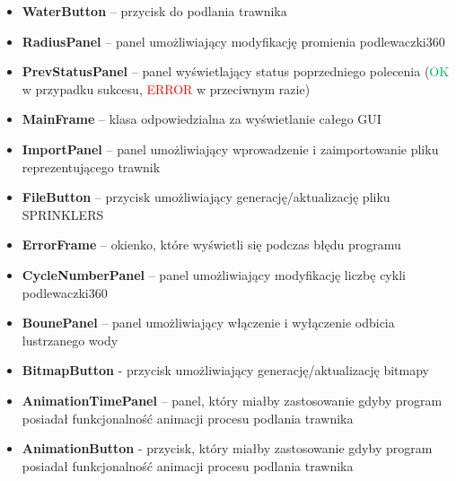 \documentclass[12pt]{article}
\renewcommand{\_}{\kern-1.5pt\textunderscore\kern-1.5pt}
\begin{document}
\begin{enumerate}
\begin{itemize}
	\item \textbf{WaterButton} – przycisk do podlania trawnika\par

	\item \textbf{RadiusPanel} – panel umożliwiający modyfikację promienia podlewaczki360\par

	\item \textbf{PrevStatusPanel} – panel wyświetlający status poprzedniego polecenia (\textcolor[HTML]{00B050}{OK }w przypadku sukcesu, \textcolor[HTML]{FF0000}{ERROR }w przeciwnym razie)\par

	\item \textbf{MainFrame} – klasa odpowiedzialna za wyświetlanie całego GUI\par

	\item \textbf{ImportPanel} – panel umożliwiający wprowadzenie i zaimportowanie pliku reprezentującego trawnik\par

	\item \textbf{FileButton} – przycisk umożliwiający generację/aktualizację pliku SPRINKLERS\par

	\item \textbf{ErrorFrame} – okienko, które wyświetli się podczas błędu programu\par

	\item \textbf{CycleNumberPanel} – panel umożliwiający modyfikację liczbę cykli podlewaczki360\par

	\item \textbf{BounePanel} – panel umożliwiający włączenie i wyłączenie odbicia lustrzanego wody\par

	\item \textbf{BitmapButton} - przycisk umożliwiający generację/aktualizację bitmapy\par

	\item \textbf{AnimationTimePanel} – panel, który miałby zastosowanie gdyby program posiadał funkcjonalność animacji procesu podlania trawnika\par

	\item \textbf{AnimationButton} - przycisk, który miałby zastosowanie gdyby program posiadał funkcjonalność animacji procesu podlania trawnika\par


\end{itemize}
\end{enumerate}
\end{document}
